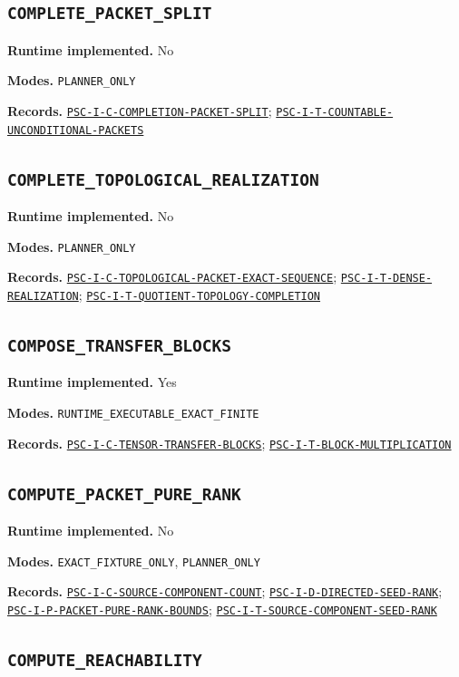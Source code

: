 \documentclass[a4paper,11pt]{article}
\newcommand{\field}[2]{\noindent\textbf{#1.} #2\par}
\begin{document}
\subsection*{\nolinkurl{COMPLETE_PACKET_SPLIT}}
\field{Runtime implemented}{No}
\field{Modes}{\nolinkurl{PLANNER_ONLY}}
\field{Records}{\hyperref[rec:PSC-I-C-COMPLETION-PACKET-SPLIT]{\nolinkurl{PSC-I-C-COMPLETION-PACKET-SPLIT}}; \hyperref[rec:PSC-I-T-COUNTABLE-UNCONDITIONAL-PACKETS]{\nolinkurl{PSC-I-T-COUNTABLE-UNCONDITIONAL-PACKETS}}}
\subsection*{\nolinkurl{COMPLETE_TOPOLOGICAL_REALIZATION}}
\field{Runtime implemented}{No}
\field{Modes}{\nolinkurl{PLANNER_ONLY}}
\field{Records}{\hyperref[rec:PSC-I-C-TOPOLOGICAL-PACKET-EXACT-SEQUENCE]{\nolinkurl{PSC-I-C-TOPOLOGICAL-PACKET-EXACT-SEQUENCE}}; \hyperref[rec:PSC-I-T-DENSE-REALIZATION]{\nolinkurl{PSC-I-T-DENSE-REALIZATION}}; \hyperref[rec:PSC-I-T-QUOTIENT-TOPOLOGY-COMPLETION]{\nolinkurl{PSC-I-T-QUOTIENT-TOPOLOGY-COMPLETION}}}
\subsection*{\nolinkurl{COMPOSE_TRANSFER_BLOCKS}}
\field{Runtime implemented}{Yes}
\field{Modes}{\nolinkurl{RUNTIME_EXECUTABLE_EXACT_FINITE}}
\field{Records}{\hyperref[rec:PSC-I-C-TENSOR-TRANSFER-BLOCKS]{\nolinkurl{PSC-I-C-TENSOR-TRANSFER-BLOCKS}}; \hyperref[rec:PSC-I-T-BLOCK-MULTIPLICATION]{\nolinkurl{PSC-I-T-BLOCK-MULTIPLICATION}}}
\subsection*{\nolinkurl{COMPUTE_PACKET_PURE_RANK}}
\field{Runtime implemented}{No}
\field{Modes}{\nolinkurl{EXACT_FIXTURE_ONLY}, \nolinkurl{PLANNER_ONLY}}
\field{Records}{\hyperref[rec:PSC-I-C-SOURCE-COMPONENT-COUNT]{\nolinkurl{PSC-I-C-SOURCE-COMPONENT-COUNT}}; \hyperref[rec:PSC-I-D-DIRECTED-SEED-RANK]{\nolinkurl{PSC-I-D-DIRECTED-SEED-RANK}}; \hyperref[rec:PSC-I-P-PACKET-PURE-RANK-BOUNDS]{\nolinkurl{PSC-I-P-PACKET-PURE-RANK-BOUNDS}}; \hyperref[rec:PSC-I-T-SOURCE-COMPONENT-SEED-RANK]{\nolinkurl{PSC-I-T-SOURCE-COMPONENT-SEED-RANK}}}
\subsection*{\nolinkurl{COMPUTE_REACHABILITY}}
\end{document}
